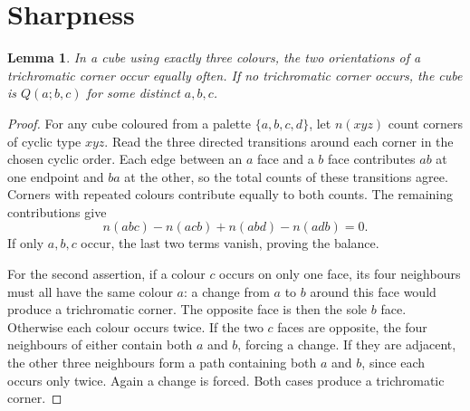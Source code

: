\documentclass[11pt]{article}
\newtheorem{lemma}{Lemma}
\theoremstyle{remark}
\begin{document}
\section{Sharpness}
\begin{lemma}\label{lem:balance}
In a cube using exactly three colours, the two orientations of a
trichromatic corner occur equally often. If no trichromatic corner occurs,
the cube is $Q(a;b,c)$ for some distinct $a,b,c$.
\end{lemma}
\begin{proof}
For any cube coloured from a palette $\{a,b,c,d\}$, let $n(xyz)$ count
corners of cyclic type $xyz$. Read the three directed transitions around
each corner in the chosen cyclic order. Each edge between an $a$ face
and a $b$ face contributes $ab$ at one endpoint and $ba$ at the other,
so the total counts of these transitions agree. Corners with repeated
colours contribute equally to both counts. The remaining contributions give
\begin{equation}\label{eq:edge-balance}
 n(abc)-n(acb)+n(abd)-n(adb)=0.
\end{equation}
If only $a,b,c$ occur, the last two terms vanish, proving the balance.

For the second assertion, if a colour $c$ occurs on only one face, its
four neighbours must all have the same colour $a$: a change from $a$ to
$b$ around this face would produce a trichromatic corner. The opposite
face is then the sole $b$ face. Otherwise each colour occurs twice.
If the two $c$ faces are opposite, the four neighbours of either contain
both $a$ and $b$, forcing a change. If they are adjacent, the other three
neighbours form a path containing both $a$ and $b$, since each occurs only
twice. Again a change is forced. Both cases produce a trichromatic corner.
\end{proof}
\end{document}
